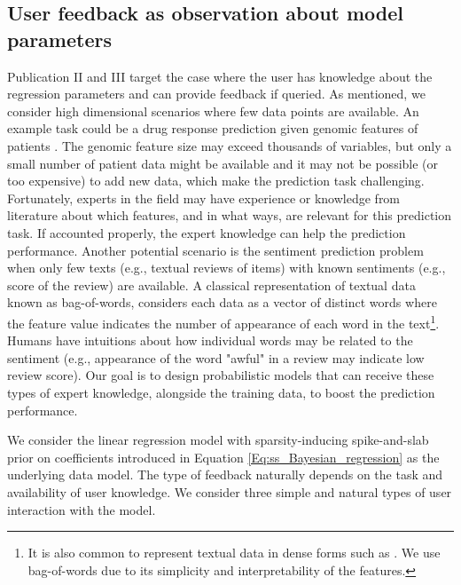 \documentclass[dissertation,math,vertlayout,pdfa,colorlinks]{aaltoseries}
\begin{document}
\subsection{User feedback as observation about model parameters}
Publication II and III target the case where the user has knowledge about the regression parameters and can provide feedback if queried. As mentioned, we consider high dimensional scenarios where few data points are available. An example task could be a drug response prediction given genomic features of patients \cite{drug_response_prediction}. The genomic feature size may exceed thousands of variables, but only a small number of patient data might be available and it may not be possible (or too expensive) to add new data, which make the prediction task challenging. Fortunately, experts in the field may have experience or knowledge from literature about which features, and in what ways, are relevant for this prediction task. If accounted properly, the expert knowledge can help the prediction performance. Another potential scenario is the sentiment prediction problem \cite{liu2015sentiment} when only few texts (e.g., textual reviews of items) with known sentiments (e.g., score of the review) are available. A classical representation of textual data known as bag-of-words, considers each data as a vector of distinct words where the feature value indicates the number of appearance of each word in the text\footnote{It is also common to represent textual data in dense forms such as \cite{dai2015semi}. We use bag-of-words due to its simplicity and interpretability of the features.}. Humans have intuitions about how individual words may be related to the sentiment (e.g., appearance of the word "awful" in a review may indicate low review score). Our goal is to design probabilistic models that can receive these types of expert knowledge, alongside the training data, to boost the prediction performance.  

We consider the linear regression model with sparsity-inducing spike-and-slab prior on coefficients introduced in Equation \ref{Eq:ss_Bayesian_regression} as the underlying data model. The type of feedback naturally depends on the task and availability of user knowledge.  We consider three simple and natural types of user interaction with the model. 
\end{document}
